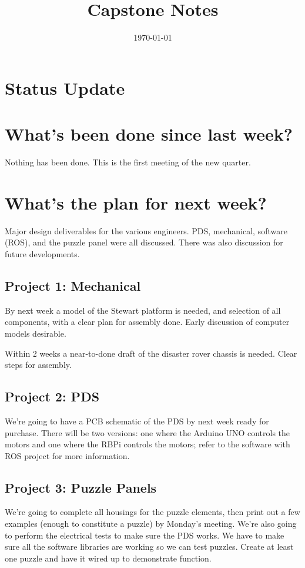 \documentclass[a4paper, 10pt]{article}
\title{Capstone Notes}
\date{\today}
\begin{document}
\maketitle

\section*{Status Update}


\section*{What's been done since last week?}
Nothing has been done. This is the first meeting of the new quarter.

\section*{What's the plan for next week?}
Major design deliverables for the various engineers. PDS, mechanical, software (ROS), and the puzzle panel were all discussed. There was also discussion for future developments.

	\subsection*{Project 1: Mechanical}
	By next week a model of the Stewart platform is needed, and selection of all components, with a clear plan for assembly done. Early discussion of computer models desirable.
	
	Within 2 weeks a near-to-done draft of the disaster rover chassis is needed. Clear steps for assembly.
	
	\subsection*{Project 2: PDS}
	We're going to have a PCB schematic of the PDS by next week ready for purchase. There will be two versions: one where the Arduino UNO controls the motors and one where the RBPi controls the motors; refer to the software with ROS project for more information.
	
	\subsection*{Project 3: Puzzle Panels}
	We're going to complete all housings for the puzzle elements, then print out a few examples (enough to constitute a puzzle) by Monday's meeting. We're also going to perform the electrical tests to make sure the PDS works. We have to make sure all the software libraries are working so we can test puzzles. Create at least one puzzle and have it wired up to demonstrate function.
	
\end{document}
